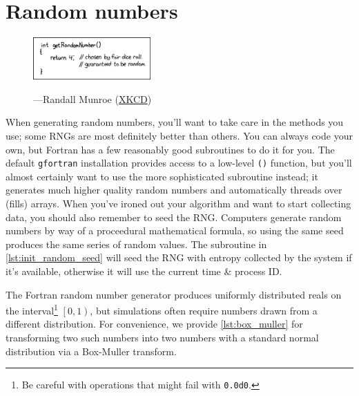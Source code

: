 \chapter{Random numbers}
\label{chap:Random numbers}
\begin{figure}[h!]
  \centering
  \includegraphics[width=0.4\textwidth]{figures/random_number.png}

  \hspace*{\fill}---Randall Munroe (\href{http://xkcd.com/221/}{XKCD})
\end{figure}
When generating random numbers, you'll want to take care in the methods you use; some RNGs are most definitely better than others.
You can always code your own, but Fortran has a few reasonably good subroutines to do it for you.
The default \texttt{gfortran} installation provides access to a low-level \texttt{()} function, but you'll almost certainly want to use the more sophisticated  subroutine instead; it generates much higher quality random numbers and automatically threads over (fills) arrays.
When you've ironed out your algorithm and want to start collecting data, you should also remember to seed the RNG.
Computers generate random numbers by way of a proceedural mathematical formula, so using the same seed produces the same series of random values.
The subroutine in \autoref{lst:init_random_seed} will seed the RNG with entropy collected by the system if it's available, otherwise it will use the current time \& process ID.


The Fortran random number generator produces uniformly distributed reals on the interval\footnote{Be careful with operations that might fail with \texttt{0.0d0}.} $\left[0, 1\right)$, but simulations often require numbers drawn from a different distribution.
For convenience, we provide \autoref{lst:box_muller} for transforming two such numbers into two numbers with a standard normal distribution via a Box-Muller transform.


